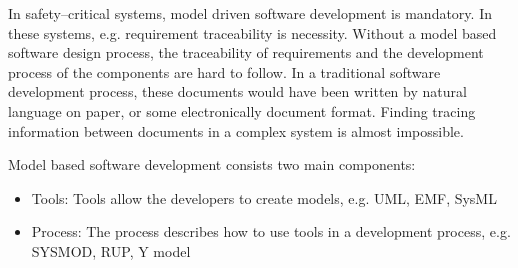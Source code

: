In safety--critical systems, model driven software development is mandatory. In these systems, e.g. requirement traceability is necessity. Without a model based software design process, the traceability of requirements and the development process of the components are hard to follow. In a traditional software development process, these documents would have been written by natural language on paper, or some electronically document format. Finding tracing information between documents in a complex system is almost impossible.

Model based software development consists two main components:
\begin{itemize}
	\item Tools: Tools allow the developers to create models, e.g. UML, EMF, SysML
	\item Process: The process describes how to use tools in a development process, e.g. SYSMOD, RUP, Y model
\end{itemize}

